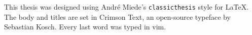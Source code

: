 This thesis was designed using Andr\'e Miede's
\texttt{classicthesis} style for \LaTeX.
The body and titles are set in Crimson Text, an open-source typeface by Sebastian Kosch.
Every last word was typed in vim.
